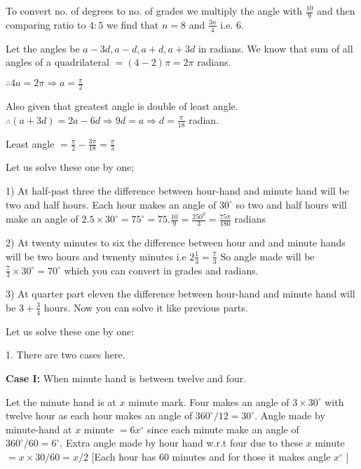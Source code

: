     To convert no. of degrees to no. of grades we multiply the angle with $\frac{10}{9}$ and then comparing ratio to
    $4:5$ we find that $n = 8$ and $\frac{3n}{4}$ i.e. $6.$

\item Let the angles be $a - 3d, a - d, a + d, a + 3d$ in radians. We know that sum of all angles of a quadrilateral $=
    (4 - 2)\pi = 2\pi$ radians.

    $\therefore 4a = 2\pi \Rightarrow a = \frac{\pi}{2}$

    Also given that greatest angle is double of least angle. $\therefore (a + 3d) = 2a - 6d \Rightarrow 9d = a \Rightarrow d
    = \frac{\pi}{18}$ radian.

    Least angle $= \frac{\pi}{2} - \frac{3\pi}{18} = \frac{\pi}{3}$

\item Let us solve these one by one;

    1) At half-past three the difference between hour-hand and minute hand will be two and half hours. Each hour makes an angle of
       $30^\circ$ so two and half hours will make an angle of $2.5\times 30^\circ = 75^\circ = 75.\frac{10}{9} =
       \frac{250^g}{3} = \frac{75\pi}{180}$ radians

    2) At twenty minutes to six the difference between hour and and minute hands will be two hours and twnenty minutes i.e
       $2\frac{1}{3} = \frac{7}{3}$ So angle made will be $\frac{7}{3}\times 30^\circ = 70^\circ$ which you can convert
       in grades and radians.

    3) At quarter part eleven the difference between hour-hand and minute hand will be $3 + \frac{3}{4}$ hours. Now you can
       solve it like previous parts.

\item Let us solve these one by one:

    1. There are two cases here.

       {\bf Case I:} When minute hand is between twelve and four.

       Let the minute hand is at $x$ minute mark. Four makes an angle of $3\times 30^\circ$ with twelve hour as each
       hour makes an angle of $360^\circ/12 = 30^\circ.$ Angle made by minute-hand at $x$ minute $=6x^\circ$
       since each minute make an angle of $360^\circ/60 = 6^\circ.$ Extra angle made by hour hand w.r.t four due to these
       $x$ minute $=x\times 30/60 = x/2$ [Each hour has $60$ minutes and for those it makes angle $x^\circ$
       ]

